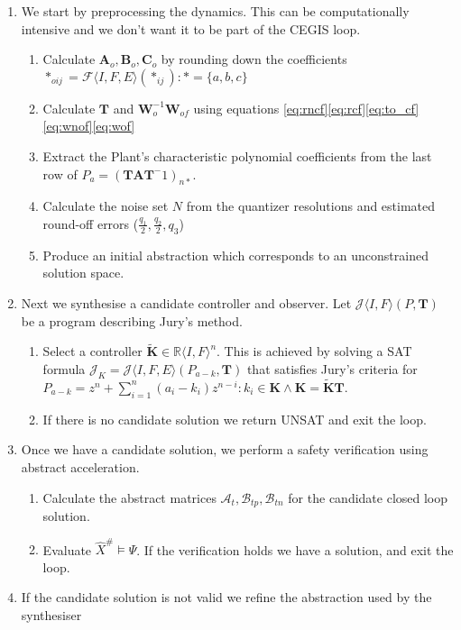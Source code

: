 \documentclass[runningheads,a4paper]{llncs}
\newcommand{\mat}[1]{\boldsymbol{#1}}
\begin{document}
\begin{enumerate}
\item We start by preprocessing the dynamics. This can be computationally intensive and we don't want it to be part of the CEGIS loop.
\begin{enumerate}
\item Calculate $\mat{A}_o,\mat{B}_o,\mat{C}_o$ by rounding down the coefficients $*_{oij}=\mathcal{F}\langle I,F,E\rangle (*_{ij}) : *=\{a,b,c\}$
\item Calculate $\mat{T}$ and $\mat{W}_o^{-1}\mat{W}_{of}$ using equations \eqref{eq:rncf}\eqref{eq:rcf}\eqref{eq:to_cf}\eqref{eq:wnof}\eqref{eq:wof}
\item Extract the Plant's characteristic polynomial coefficients from the last row of $P_a=(\mat{T}\mat{A}\mat{T}^-1)_{n*}$.
\item Calculate the noise set $N$ from the quantizer resolutions and estimated round-off errors ($\frac{q_1}{2},\frac{q_2}{2},q_3$)
\item Produce an initial abstraction which corresponds to an unconstrained solution space.
\end{enumerate}
\item Next we synthesise a candidate controller and observer. Let $\mathcal{J}\langle I,F \rangle (P,\mat{T})$ be a program describing Jury's method.
\begin{enumerate}
\item Select a controller $\tilde{\mat{K}} \in \mathbb{R}\langle I,F\rangle^n$. This is achieved by solving a SAT formula $\mathcal{J}_K=\mathcal{J}\langle I,F,E \rangle (P_{a-k},\mat{T})$ that satisfies Jury's criteria for $P_{a-k}=z^n+\sum_{i=1}^n (a_i-k_i) z^{n-i} : k_i \in \mat{K} \wedge \mat{K}=\tilde{\mat{K}}\mat{T}$.
\item If there is no candidate solution we return UNSAT and exit the loop.
\end{enumerate}
\item Once we have a candidate solution, we perform a safety verification using abstract acceleration.
\begin{enumerate}
\item Calculate the abstract matrices $\mathcal{A}_t, \mathcal{B}_{tp},\mathcal{B}_{tn}$ for the candidate closed loop solution.
\item Evaluate $\hat{X}^\# \models \Psi$. If the verification holds we have a solution, and exit the loop.
\end{enumerate} 
\item If the candidate solution is not valid we refine the abstraction used by the synthesiser

\end{enumerate}
\end{document}
